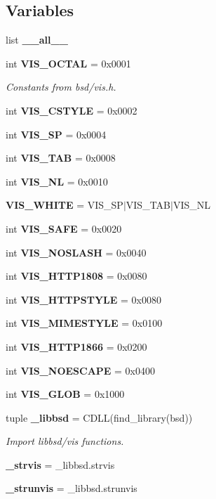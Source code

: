 \subsection*{Variables}
\begin{DoxyCompactItemize}
\item 
list {\bf \+\_\+\+\_\+all\+\_\+\+\_\+}
\item 
int {\bf V\+I\+S\+\_\+\+O\+C\+T\+A\+L} = 0x0001
\begin{DoxyCompactList}\small\item\em Constants from bsd/vis.\+h. \end{DoxyCompactList}\item 
int {\bf V\+I\+S\+\_\+\+C\+S\+T\+Y\+L\+E} = 0x0002
\item 
int {\bf V\+I\+S\+\_\+\+S\+P} = 0x0004
\item 
int {\bf V\+I\+S\+\_\+\+T\+A\+B} = 0x0008
\item 
int {\bf V\+I\+S\+\_\+\+N\+L} = 0x0010
\item 
{\bf V\+I\+S\+\_\+\+W\+H\+I\+T\+E} = V\+I\+S\+\_\+\+S\+P$\vert$V\+I\+S\+\_\+\+T\+A\+B$\vert$V\+I\+S\+\_\+\+N\+L
\item 
int {\bf V\+I\+S\+\_\+\+S\+A\+F\+E} = 0x0020
\item 
int {\bf V\+I\+S\+\_\+\+N\+O\+S\+L\+A\+S\+H} = 0x0040
\item 
int {\bf V\+I\+S\+\_\+\+H\+T\+T\+P1808} = 0x0080
\item 
int {\bf V\+I\+S\+\_\+\+H\+T\+T\+P\+S\+T\+Y\+L\+E} = 0x0080
\item 
int {\bf V\+I\+S\+\_\+\+M\+I\+M\+E\+S\+T\+Y\+L\+E} = 0x0100
\item 
int {\bf V\+I\+S\+\_\+\+H\+T\+T\+P1866} = 0x0200
\item 
int {\bf V\+I\+S\+\_\+\+N\+O\+E\+S\+C\+A\+P\+E} = 0x0400
\item 
int {\bf V\+I\+S\+\_\+\+G\+L\+O\+B} = 0x1000
\item 
tuple {\bf \+\_\+libbsd} = C\+D\+L\+L(find\+\_\+library(\textquotesingle{}bsd\textquotesingle{}))
\begin{DoxyCompactList}\small\item\em Import libbsd/vis functions. \end{DoxyCompactList}\item 
{\bf \+\_\+strvis} = \+\_\+libbsd.\+strvis
\item 
{\bf \+\_\+strunvis} = \+\_\+libbsd.\+strunvis
\end{DoxyCompactItemize}
